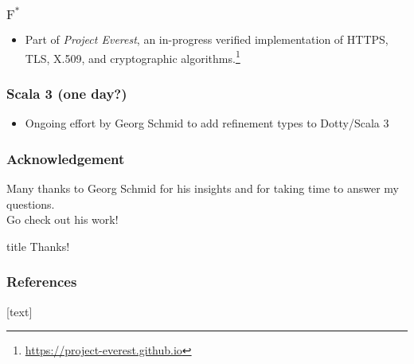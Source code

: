 \documentclass[ignorenonframetext,]{beamer}
\begin{document}
\frame
{
  \frametitle{$\text{F}^\ast$}
  
  \begin{itemize}
  \item Part of \textit{Project Everest}, an in-progress verified implementation of HTTPS, TLS, X.509, and cryptographic algorithms.\footnote{\url{https://project-everest.github.io}}
  \end{itemize}
}

\frame
{
  \frametitle{Scala 3 (one day?)}
    \begin{itemize}
    \item Ongoing effort by Georg Schmid to add refinement types to Dotty/Scala 3\cite{georg}
    \end{itemize}
  
}

\frame
{
  \frametitle{Acknowledgement}
  
  Many thanks to Georg Schmid for his insights and for taking time to answer my questions.\\
  \vspace{10pt}
  Go check out his work! \cite{georg}
}

\begin{frame}
  \vfill
  \centering
  \begin{beamercolorbox}[sep=8pt,center]{title}
    Thanks!\par%
  \end{beamercolorbox}
  \vfill
\end{frame}

\begin{frame}[allowframebreaks]
  \frametitle{References}
  [text]
  
  
\end{frame}
\end{document}
